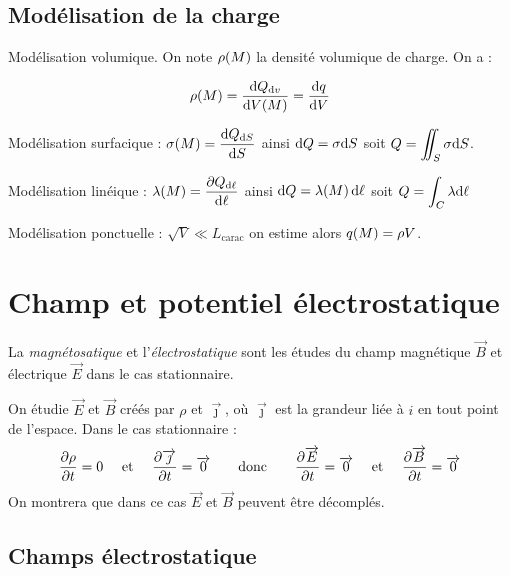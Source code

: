 \documentclass[a4paper,french,bookmarks]{book}
\begin{document}
    \subsection{Modélisation de la charge}
    
    \begin{enumerate}
        \itt Modélisation volumique. On note $\rho\!\left(M\right)$ la densité volumique de charge. On a :
    
        \[ \rho\!\left(M\right) = \dfrac{\mathrm d Q_{\mathrm d v}}{\mathrm d V\!\left(M\right)} = \dfrac{\mathrm d q}{\mathrm d V}\]
        
        \itt Modélisation surfacique : $\sigma\!\left(M\right) = \dfrac{\mathrm d Q_{\mathrm d S}}{\mathrm d S}$ ainsi $\mathrm d Q = \sigma \mathrm d S$ soit $Q = \displaystyle\int\mkern-15mu\int_S\sigma\mathrm d S$.
        
        \itt Modélisation linéique : $\lambda\!\left(M\right) =\dfrac{\partial Q_{\mathrm d \ell}}{\mathrm d \ell}$ ainsi $\mathrm d Q= \lambda\!\left(M\right)\mathrm d \ell$ soit $\displaystyle Q=\int_C\lambda\mathrm d \ell$

        \itt Modélisation ponctuelle : $\sqrt{V} \ll L_\text{carac}$ on estime alors $q\!\left(M\right) = \rho V$.
    \end{enumerate}

    \section{Champ et potentiel électrostatique}

    La \emph{magnétosatique} et l'\emph{électrostatique} sont les études du champ magnétique $\vec B$ et électrique $\vec E$ dans le cas stationnaire.
    
    On étudie $\vec E$ et $\vec B$ créés par $\rho$ et $\vec{\jmath}$, où $\vec{\jmath}$ est la grandeur liée à $i$ en tout point de l'espace. Dans le cas stationnaire :
    \[ \dfrac{\partial \rho}{\partial t} = 0 \quad\ \text{et} \ \quad \dfrac{\partial \overrightarrow{\jmath}}{\partial t} = \overrightarrow{0} \qquad\text{donc}\qquad \dfrac{\partial \overrightarrow{E}}{\partial t} = \overrightarrow{0} \quad\ \text{et} \ \quad \dfrac{\partial \overrightarrow{B}}{\partial t} = \overrightarrow{0}   \]
    On montrera que dans ce cas $\vec E$ et $\vec B$ peuvent être décomplés.

    \subsection{Champs électrostatique}
\end{document}
